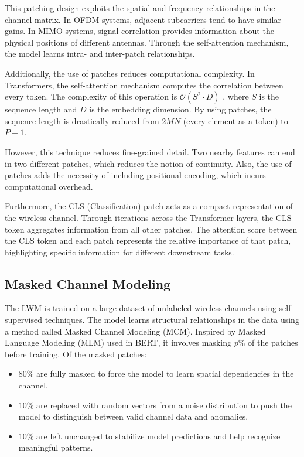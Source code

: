 This patching design exploits the spatial and frequency relationships in the channel matrix. In OFDM systems, adjacent subcarriers tend to have similar gains. In MIMO systems, signal correlation provides information about the physical positions of different antennas. Through the self-attention mechanism, the model learns intra- and inter-patch relationships.

Additionally, the use of patches reduces computational complexity. In Transformers, the self-attention mechanism computes the correlation between every token. The complexity of this operation is $\mathcal{O}(S^2 \cdot D)$ \cite{vaswani2017}, where $S$ is the sequence length and $D$ is the embedding dimension. By using patches, the sequence length is drastically reduced from $2MN$ (every element as a token) to $P + 1$.

However, this technique reduces fine-grained detail. Two nearby features can end in two different patches, which reduces the notion of continuity. Also, the use of patches adds the necessity of including positional encoding, which incurs computational overhead.

Furthermore, the CLS (Classification) patch acts as a compact representation of the wireless channel. Through iterations across the Transformer layers, the CLS token aggregates information from all other patches. The attention score between the CLS token and each patch represents the relative importance of that patch, highlighting specific information for different downstream tasks.

\subsection{Masked Channel Modeling}\label{sec:masked_channel_modeling}

The LWM is trained on a large dataset of unlabeled wireless channels using self-supervised techniques. The model learns structural relationships in the data using a method called Masked Channel Modeling (MCM).  Inspired by Masked Language Modeling (MLM) used in BERT, it involves masking $p\%$ of the patches before training.
Of the masked patches:

\begin{itemize}
    \item 80\% are fully masked to force the model to learn spatial dependencies in the channel.
    \item 10\% are replaced with random vectors from a noise distribution to push the model to distinguish between valid channel data and anomalies.
    \item 10\% are left unchanged to stabilize model predictions and help recognize meaningful patterns.
\end{itemize}

